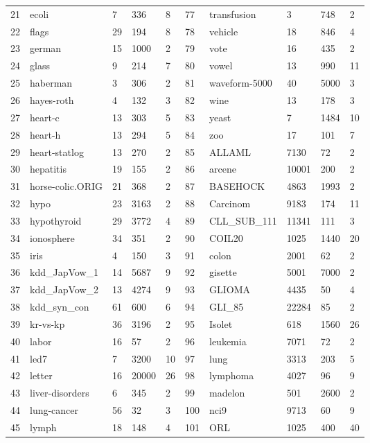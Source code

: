 \documentclass[acmsmall]{acmart}
\begin{document}
\begin{table}[!h]
{\begin{threeparttable}
\begin{tabular}{l l l l l | l l l l l}
				21 & ecoli & 7 & 336 & 8 & 77 & transfusion & 3 & 748 & 2\\
				22 & flags & 29 & 194 & 8 & 78 & vehicle & 18 & 846 & 4\\
				23 & german & 15 & 1000 & 2 & 79 & vote & 16 & 435 & 2\\
				24 & glass & 9 & 214 & 7 & 80 & vowel & 13 & 990 & 11\\
				25 & haberman & 3 & 306 & 2 & 81 & waveform-5000 & 40 & 5000 & 3\\
				26 & hayes-roth & 4 & 132 & 3 & 82 & wine & 13 & 178 & 3\\
				27 & heart-c & 13 & 303 & 5 & 83 & yeast & 7 & 1484 & 10\\
				28 & heart-h & 13 & 294 & 5 & 84 & zoo & 17 & 101 & 7\\
				29 & heart-statlog & 13 & 270 & 2 & 85 & ALLAML & 7130 & 72 & 2\\
				30 & hepatitis & 19 & 155 & 2 & 86 & arcene & 10001 & 200 & 2\\
				31 & horse-colic.ORIG & 21 & 368 & 2 & 87 & BASEHOCK & 4863 & 1993 & 2\\
				32 & hypo & 23 & 3163 & 2 & 88 & Carcinom & 9183 & 174 & 11\\
				33 & hypothyroid & 29 & 3772 & 4 & 89 & CLL\_SUB\_111 & 11341 & 111 & 3\\
				34 & ionosphere & 34 & 351 & 2 & 90 & COIL20 & 1025 & 1440 & 20\\
				35 & iris & 4 & 150 & 3 & 91 & colon & 2001 & 62 & 2\\
				36 & kdd\_JapVow\_1 & 14 & 5687 & 9 & 92 & gisette & 5001 & 7000 & 2\\
				37 & kdd\_JapVow\_2 & 13 & 4274 & 9 & 93 & GLIOMA & 4435 & 50 & 4\\
				38 & kdd\_syn\_con & 61 & 600 & 6 & 94 & GLI\_85 & 22284 & 85 & 2\\
				39 & kr-vs-kp & 36 & 3196 & 2 & 95 & Isolet & 618 & 1560 & 26\\
				40 & labor & 16 & 57 & 2 & 96 & leukemia & 7071 & 72 & 2\\
				41 & led7 & 7 & 3200 & 10 & 97 & lung & 3313 & 203 & 5\\
				42 & letter & 16 & 20000 & 26 & 98 & lymphoma & 4027 & 96 & 9\\
				43 & liver-disorders & 6 & 345 & 2 & 99 & madelon & 501 & 2600 & 2\\
				44 & lung-cancer & 56 & 32 & 3 & 100 & nci9 & 9713 & 60 & 9\\
				45 & lymph & 18 & 148 & 4 & 101 & ORL & 1025 & 400 & 40\\

\end{tabular}
\end{threeparttable}}
\end{table}
\end{document}
